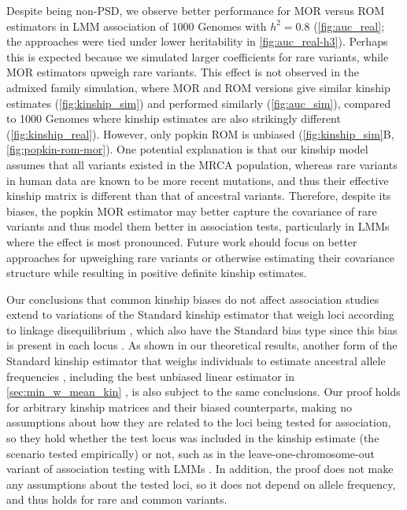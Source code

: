 \documentclass[11pt]{article}
\begin{document}
\begin{linenumbers}
Despite being non-PSD, we observe better performance for MOR versus ROM estimators in LMM association of 1000 Genomes with $h^2=0.8$ (\cref{fig:auc_real}; the approaches were tied under lower heritability in \cref{fig:auc_real-h3}).
Perhaps this is expected because we simulated larger coefficients for rare variants, while MOR estimators upweigh rare variants.
This effect is not observed in the admixed family simulation, where MOR and ROM versions give similar kinship estimates (\cref{fig:kinship_sim}) and performed similarly (\cref{fig:auc_sim}), compared to 1000 Genomes where kinship estimates are also strikingly different (\cref{fig:kinship_real}).
However, only popkin ROM is unbiased (\cref{fig:kinship_sim}B, \cref{fig:popkin-rom-mor}).
One potential explanation is that our kinship model assumes that all variants existed in the MRCA population, whereas rare variants in human data are known to be more recent mutations, and thus their effective kinship matrix is different than that of ancestral variants.
Therefore, despite its biases, the popkin MOR estimator may better capture the covariance of rare variants and thus model them better in association tests, particularly in LMMs where the effect is most pronounced.
Future work should focus on better approaches for upweighing rare variants or otherwise estimating their covariance structure while resulting in positive definite kinship estimates.

Our conclusions that common kinship biases do not affect association studies extend to variations of the Standard kinship estimator that weigh loci according to linkage disequilibrium \citep{speed_reevaluation_2017, wang_efficient_2017}, which also have the Standard bias type since this bias is present in each locus \citep{ochoa_estimating_2021}.
As shown in our theoretical results, another form of the Standard kinship estimator that weighs individuals to estimate ancestral allele frequencies \pith, including the best unbiased linear estimator in \cref{sec:min_w_mean_kin} \citep{astle_population_2009, thornton_roadtrips:_2010}, is also subject to the same conclusions.
Our proof holds for arbitrary kinship matrices and their biased counterparts, making no assumptions about how they are related to the loci being tested for association, so they hold whether the test locus was included in the kinship estimate (the scenario tested empirically) or not, such as in the leave-one-chromosome-out variant of association testing with LMMs \citep{lippert_fast_2011, yang_advantages_2014}.
In addition, the proof does not make any assumptions about the tested loci, so it does not depend on allele frequency, and thus holds for rare and common variants.


\end{linenumbers}
\end{document}
